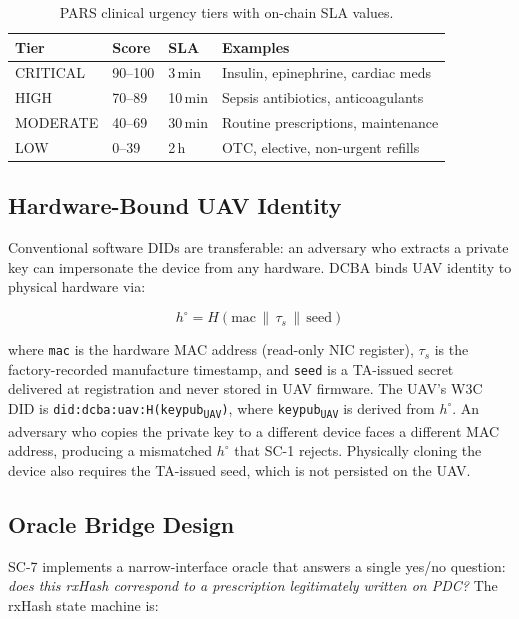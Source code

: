 \documentclass[sigplan,screen]{acmart}
\newcommand{\dcba}{\textsc{DCBA}\xspace}
\newcommand{\pars}{\textsc{PARS}\xspace}
\begin{document}
\begin{table}[t]
\caption{\pars clinical urgency tiers with on-chain SLA values.}
\label{tab:pars}
\small
\begin{tabular}{@{}llll@{}}
\toprule
\textbf{Tier} & \textbf{Score} & \textbf{SLA} & \textbf{Examples} \\
\midrule
CRITICAL & 90--100 & 3\,min  & Insulin, epinephrine, cardiac meds \\
HIGH     & 70--89  & 10\,min & Sepsis antibiotics, anticoagulants \\
MODERATE & 40--69  & 30\,min & Routine prescriptions, maintenance \\
LOW      & 0--39   & 2\,h    & OTC, elective, non-urgent refills \\
\bottomrule
\end{tabular}
\end{table}

\subsection{Hardware-Bound UAV Identity}
\label{subsec:hwid}

Conventional software DIDs are transferable: an adversary who extracts a
private key can impersonate the device from any hardware.
\dcba binds UAV identity to physical hardware via:

\begin{equation}
  h^\circ = H(\text{mac} \,\|\, \tau_s \,\|\, \text{seed})
  \label{eq:hwid}
\end{equation}

\noindent where \texttt{mac} is the hardware MAC address (read-only NIC
register), $\tau_s$ is the factory-recorded manufacture timestamp, and
\texttt{seed} is a TA-issued secret delivered at registration and never
stored in UAV firmware.
The UAV's W3C DID is \texttt{did:dcba:uav:H(keypub\textsubscript{UAV})},
where \texttt{keypub\textsubscript{UAV}} is derived from $h^\circ$.
An adversary who copies the private key to a different device faces a
different MAC address, producing a mismatched $h^\circ$ that SC-1 rejects.
Physically cloning the device also requires the TA-issued seed, which is
not persisted on the UAV.

\subsection{Oracle Bridge Design}
\label{subsec:oracle}

SC-7 implements a narrow-interface oracle that answers a single yes/no
question: \emph{does this rxHash correspond to a prescription legitimately
written on PDC?}
The rxHash state machine is:
\end{document}
